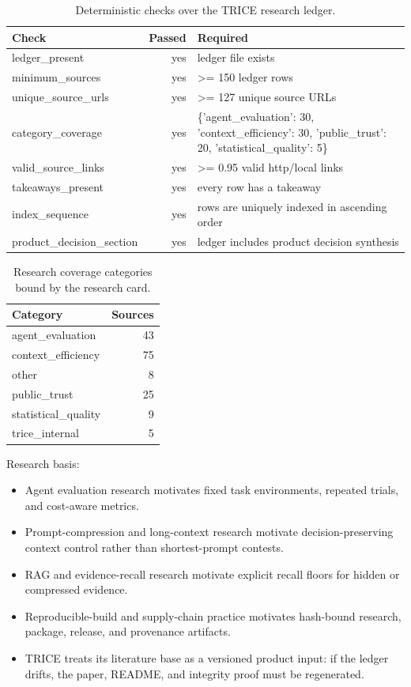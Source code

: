 \documentclass[10pt]{article}
\begin{document}
\begin{table}[h]
\centering
\begin{tabular}{lrl}
\toprule
Check & Passed & Required \\
\midrule
ledger\_present & yes & ledger file exists \\
minimum\_sources & yes & >= 150 ledger rows \\
unique\_source\_urls & yes & >= 127 unique source URLs \\
category\_coverage & yes & \{'agent\_evaluation': 30, 'context\_efficiency': 30, 'public\_trust': 20, 'statistical\_quality': 5\} \\
valid\_source\_links & yes & >= 0.95 valid http/local links \\
takeaways\_present & yes & every row has a takeaway \\
index\_sequence & yes & rows are uniquely indexed in ascending order \\
product\_decision\_section & yes & ledger includes product decision synthesis \\
\bottomrule
\end{tabular}
\caption{Deterministic checks over the TRICE research ledger.}
\end{table}

\begin{table}[h]
\centering
\begin{tabular}{lr}
\toprule
Category & Sources \\
\midrule
agent\_evaluation & 43 \\
context\_efficiency & 75 \\
other & 8 \\
public\_trust & 25 \\
statistical\_quality & 9 \\
trice\_internal & 5 \\
\bottomrule
\end{tabular}
\caption{Research coverage categories bound by the research card.}
\end{table}

\noindent Research basis:
\begin{itemize}
\item Agent evaluation research motivates fixed task environments, repeated trials, and cost-aware metrics.
\item Prompt-compression and long-context research motivate decision-preserving context control rather than shortest-prompt contests.
\item RAG and evidence-recall research motivate explicit recall floors for hidden or compressed evidence.
\item Reproducible-build and supply-chain practice motivates hash-bound research, package, release, and provenance artifacts.
\item TRICE treats its literature base as a versioned product input: if the ledger drifts, the paper, README, and integrity proof must be regenerated.
\end{itemize}
\end{document}
